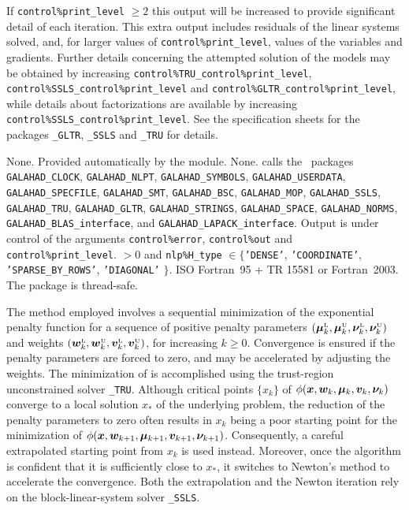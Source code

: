 \documentclass{galahad}
\newcommand{\packagename}{EXPO}
\newcommand{\sL}{\s{L}}
\newcommand{\sU}{\s{U}}
\begin{document}
If {\tt control\%print\_level} $\geq 2$ this
output will be increased to provide significant detail of each iteration.
This extra output includes residuals of the linear systems solved, and,
for larger values of {\tt control\%print\_level}, values of the variables
and gradients. Further details concerning the attempted solution of the models
may be obtained by increasing
{\tt control\%TRU\_control\%print\_level},
{\tt control\%SSLS\_control\%print\_level}
and
{\tt control\%GLTR\_control\%print\-\_level},
while details about factorizations are available
by increasing
{\tt control\%SSLS\_control\%print\_level}.
See the specification sheets for the packages
{\tt \libraryname\_GLTR},
{\tt \libraryname\_SSLS} and
{\tt \libraryname\_TRU}
for details.


\galgeneral

\galcommon None.
\galworkspace Provided automatically by the module.
\galroutines None.
\galmodules {\tt \packagename\_solve} calls the \galahad\ packages
{\tt GALAHAD\_CLOCK},
{\tt GALAHAD\_NLPT},
{\tt GALAHAD\_SY\-M\-BOLS}, \sloppy
{\tt GALAHAD\_USERDATA},
{\tt GALAHAD\_SPECFILE},
{\tt GALAHAD\_SMT},
{\tt GALAHAD\_BSC},
{\tt GALAHAD\_MOP},
{\tt GALAHAD\_SSLS},
{\tt GALAHAD\_TRU},
{\tt GALAHAD\_GLTR},
{\tt GALAHAD\_STRINGS},
{\tt GALAHAD\_SPACE},
{\tt GALAHAD\_\-NORMS},
{\tt GALAHAD\_BLAS\_interface},
and
{\tt GALAHAD\_LAPACK\_interface}.
\galio Output is under control of the arguments
 {\tt control\%error}, {\tt control\%out} and {\tt control\%print\_level}.
 $> 0$ and
{\tt nlp\%H\_type} $\in \{${\tt 'DENSE'},
 {\tt 'COORDINATE'}, {\tt 'SPARSE\_BY\_ROWS'}, {\tt 'DIAGONAL'} $\}$.
\galportability ISO Fortran~95 + TR 15581 or Fortran~2003.
The package is thread-safe.


\galmethod
The method employed involves a sequential minimization of the exponential
penalty function  for a sequence of positive penalty parameters
$(\bmmu\sL_k, \bmmu\sU_k, \bmnu\sL_k, \bmnu\sU_k)$ 
and weights
$(\bmw\sL_k, \bmw\sU_k, \bmv\sL_k, \bmv\sU_k)$,
for increasing $k \geq 0$. Convergence is ensured if the
penalty parameters are forced to zero, and may be accelerated
by adjusting the weights. The minimization of  is 
accomplished using the trust-region unconstrained solver 
{\tt \libraryname\_TRU}. Although critical points $\{x_k\}$ of 
$\phi({\bm{x}},{\bm{w}}_k,\bm \mu_k,{\bm{v}}_k,\bm \nu_k)$ converge to a local solution $x_*$
of the underlying problem, the reduction of the penalty parameters to
zero often results in $x_k$ being a poor starting point for the minimization 
of $\phi({\bm{x}},{\bm{w}}_{k+1},\bm \mu_{k+1},{\bm{v}}_{k+1},\bm \nu_{k+1})$. Consequently, 
a careful extrapolated starting point from $x_k$ is used instead. Moreover,
once the algorithm is confident that it is sufficiently close to $x_*$,
it switches to Newton's method to accelerate the convergence. Both the
extrapolation and the Newton iteration rely on the block-linear-system
solver {\tt \libraryname\_SSLS}.
\vspace*{1mm}
\end{document}
